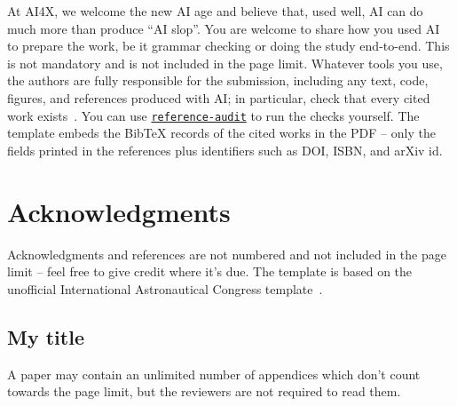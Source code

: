 \documentclass{ai4x}
\begin{document}
At AI4X, we welcome the new AI age and believe that, used well, AI can do much more than produce ``AI slop''. You are welcome to share how you used AI to prepare the work, be it grammar checking or doing the study end-to-end. This is not mandatory and is not included in the page limit. Whatever tools you use, the authors are fully responsible for the submission, including any text, code, figures, and references produced with AI; in particular, check that every cited work exists~\cite{ai4x2028hallucinated}. You can use \href{https://github.com/constructorfabric/reference-audit/}{\texttt{reference-audit}} to run the checks yourself. The template embeds the BibTeX records of the cited works in the PDF -- only the fields printed in the references plus identifiers such as DOI, ISBN, and arXiv id.

\section*{Acknowledgments}
Acknowledgments and references are not numbered and not included in the page limit -- feel free to give credit where it's due. The template is based on the unofficial International Astronautical Congress template~\cite{iactemplate}.



\begin{appendices}
\section{My title}
A paper may contain an unlimited number of appendices which don't count towards the page limit, but the reviewers are not required to read them.
\end{appendices}
\end{document}
